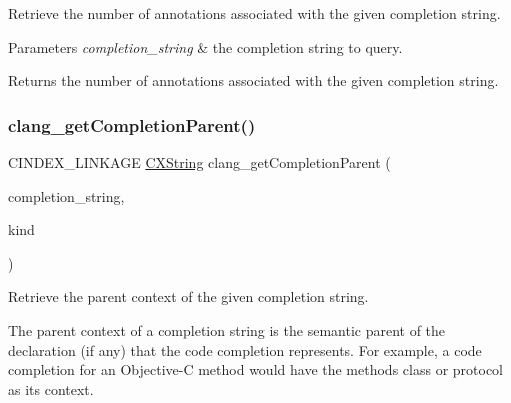 Retrieve the number of annotations associated with the given completion string. 


\begin{DoxyParams}{Parameters}
{\em completion\+\_\+string} & the completion string to query.\\
\hline
\end{DoxyParams}
\begin{DoxyReturn}{Returns}
the number of annotations associated with the given completion string. 
\end{DoxyReturn}
\mbox{\label{group__CINDEX__CODE__COMPLET_ga8afa885ca6547c96baa1369179b3b236}} 
\subsubsection{\texorpdfstring{clang\+\_\+get\+Completion\+Parent()}{clang\_getCompletionParent()}}
{\footnotesize\ttfamily C\+I\+N\+D\+E\+X\+\_\+\+L\+I\+N\+K\+A\+GE \mbox{\hyperlink{structCXString}{C\+X\+String}} clang\+\_\+get\+Completion\+Parent (\begin{DoxyParamCaption}\item[{\mbox{\hyperlink{group__CINDEX__CODE__COMPLET_gafea23a43a60ec3b4f3bedccfbb76883a}{C\+X\+Completion\+String}}}]{completion\+\_\+string,  }\item[{enum \mbox{\hyperlink{group__CINDEX_gaaccc432245b4cd9f2d470913f9ef0013}{C\+X\+Cursor\+Kind}} $\ast$}]{kind }\end{DoxyParamCaption})}



Retrieve the parent context of the given completion string. 

The parent context of a completion string is the semantic parent of the declaration (if any) that the code completion represents. For example, a code completion for an Objective-\/C method would have the method\textquotesingle{}s class or protocol as its context.


